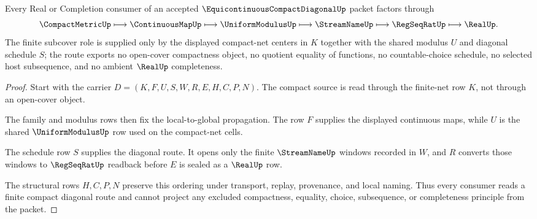 \begin{theorem}
\label{thm:equicontinuous-compact-diagonal-finite-subcover-route}
Every Real or Completion consumer of an accepted $\EquicontinuousCompactDiagonalUp$ packet factors through
$$
\CompactMetricUp
\longmapsto
\ContinuousMapUp
\longmapsto
\UniformModulusUp
\longmapsto
\StreamNameUp
\longmapsto
\RegSeqRatUp
\longmapsto
\RealUp .
$$
The finite subcover role is supplied only by the displayed compact-net centers in $K$ together with the shared modulus $U$ and diagonal schedule $S$; the route exports no open-cover compactness object, no quotient equality of functions, no countable-choice schedule, no selected host subsequence, and no ambient $\RealUp$ completeness.
\end{theorem}
\begin{proof}
Start with the carrier $D=(K,F,U,S,W,R,E,H,C,P,N)$. The compact source is read through the finite-net row $K$, not through an open-cover object.

The family and modulus rows then fix the local-to-global propagation. The row $F$ supplies the displayed continuous maps, while $U$ is the shared $\UniformModulusUp$ row used on the compact-net cells.

The schedule row $S$ supplies the diagonal route. It opens only the finite $\StreamNameUp$ windows recorded in $W$, and $R$ converts those windows to $\RegSeqRatUp$ readback before $E$ is sealed as a $\RealUp$ row.

The structural rows $H,C,P,N$ preserve this ordering under transport, replay, provenance, and local naming. Thus every consumer reads a finite compact diagonal route and cannot project any excluded compactness, equality, choice, subsequence, or completeness principle from the packet.
\end{proof}



